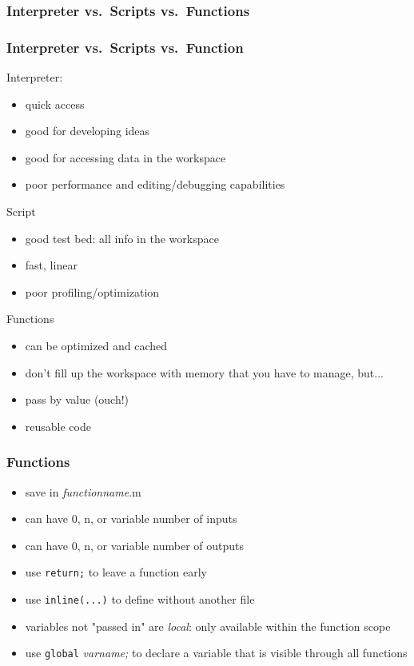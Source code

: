 \documentclass[10pt]{beamer}
\begin{document}
\begin{frame}[shrink]
\frametitle{Interpreter vs.~Scripts vs.~Functions}
\end{frame}
\begin{frame}
\frametitle{Interpreter vs.~Scripts vs.~Function}
Interpreter:
\begin{itemize}
\item quick access
\item good for developing ideas
\item good for accessing data in the workspace
\item poor performance and editing/debugging capabilities
\end{itemize}
Script
\begin{itemize}
\item good test bed: all info in the workspace
\item fast, linear
\item poor profiling/optimization
\end{itemize}
Functions
\begin{itemize}
\item can be optimized and cached
\item don't fill up the workspace with memory that you have to manage,
but...
\item pass by value (ouch!)
\item reusable code
\end{itemize}
\end{frame}
\begin{frame}
\frametitle{Functions}
\begin{itemize}
  \item save in \emph{functionname}.m
  \item can have 0, n, or variable number of inputs
  \item can have 0, n, or variable number of outputs
  \item use {\texttt{return;}} to leave a function early
  \item use {\texttt{inline(...)}} to define without another file
  \item variables not "passed in" are \emph{local}: only available within
  the function scope
  \item use {\texttt{global}} \emph{varname;} to declare a variable that is
  visible through all functions
\end{itemize}
\end{frame}
\end{document}
